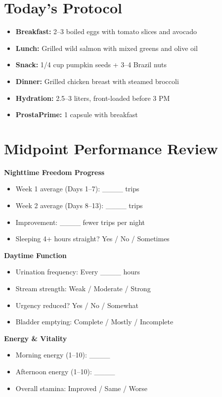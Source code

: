 \documentclass[11pt,oneside]{book}
\begin{document}
\section*{Today's Protocol}
\begin{itemize}[leftmargin=*]
\item \textbf{Breakfast:} 2--3 boiled eggs with tomato slices and avocado
\item \textbf{Lunch:} Grilled wild salmon with mixed greens and olive oil
\item \textbf{Snack:} 1/4 cup pumpkin seeds + 3--4 Brazil nuts
\item \textbf{Dinner:} Grilled chicken breast with steamed broccoli
\item \textbf{Hydration:} 2.5--3 liters, front-loaded before 3 PM
\item \textbf{ProstaPrime:} 1 capsule with breakfast
\end{itemize}

\section*{Midpoint Performance Review}

\textbf{Nighttime Freedom Progress}
\begin{itemize}[leftmargin=*]
\item Week 1 average (Days 1--7): \_\_\_\_ trips
\item Week 2 average (Days 8--13): \_\_\_\_ trips
\item Improvement: \_\_\_\_ fewer trips per night
\item Sleeping 4+ hours straight? Yes / No / Sometimes
\end{itemize}

\textbf{Daytime Function}
\begin{itemize}[leftmargin=*]
\item Urination frequency: Every \_\_\_\_ hours
\item Stream strength: Weak / Moderate / Strong
\item Urgency reduced? Yes / No / Somewhat
\item Bladder emptying: Complete / Mostly / Incomplete
\end{itemize}

\textbf{Energy \& Vitality}
\begin{itemize}[leftmargin=*]
\item Morning energy (1--10): \_\_\_\_
\item Afternoon energy (1--10): \_\_\_\_
\item Overall stamina: Improved / Same / Worse
\end{itemize}
\end{document}
